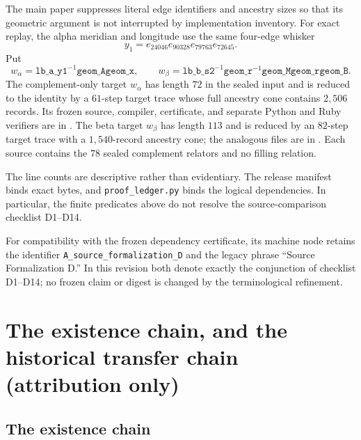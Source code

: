 \documentclass[11pt]{article}
\theoremstyle{definition}
\begin{document}
The main paper suppresses literal edge identifiers and ancestry sizes so that
its geometric argument is not interrupted by implementation inventory.  For
exact replay, the alpha meridian and longitude use the same four-edge whisker
\[
 y_1=e_{24046}e_{90328}e_{79763}e_{72645}.
\]
Put
\[
 w_\alpha=\texttt{lb\_a\_y1}^{-1}\texttt{geom\_A}\texttt{geom\_x},
 \qquad
 w_\beta=\texttt{lb\_b\_s2}^{-1}\texttt{geom\_r}^{-1}
          \texttt{geom\_M}\texttt{geom\_r}\texttt{geom\_B}.
\]
The complement-only target $w_\alpha$ has length $72$
in the sealed input and is reduced to the identity by a $61$-step target
trace whose full ancestry cone contains $2{,}506$ records.  Its frozen source,
compiler, certificate, and separate Python and Ruby verifiers are in
.  The beta target
$w_\beta$ has length $113$ and is reduced by an
$82$-step target trace with a $1{,}540$-record ancestry cone; the analogous
files are in .  Each source
contains the $78$ sealed complement relators and no filling relation.

The line counts are descriptive rather than evidentiary.  The release
manifest binds exact bytes, and \texttt{proof\_ledger.py} binds the logical
dependencies.  In particular, the finite predicates above do not resolve
the source-comparison checklist D1--D14.

For compatibility with the frozen dependency certificate, its machine node
retains the identifier \texttt{A\_source\_formalization\_D} and the legacy
phrase ``Source Formalization D.''  In this revision both denote exactly the
conjunction of checklist D1--D14; no frozen claim or digest is changed by the
terminological refinement.


\appendix
\section{The existence chain, and the historical transfer chain
(attribution only)}\label{sec:downstream}

\subsection*{The existence chain}
\end{document}
